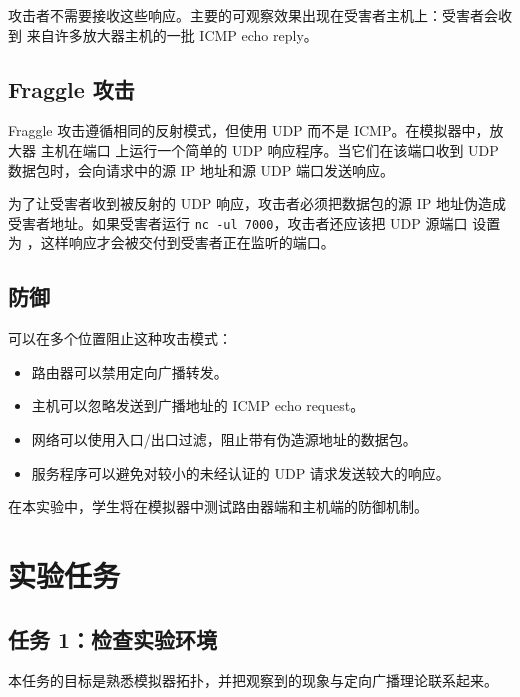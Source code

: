攻击者不需要接收这些响应。主要的可观察效果出现在受害者主机上：受害者会收到
来自许多放大器主机的一批 ICMP echo reply。


\subsection{Fraggle 攻击}

Fraggle 攻击遵循相同的反射模式，但使用 UDP 而不是 ICMP。在模拟器中，放大器
主机在端口 \fraggleport 上运行一个简单的 UDP 响应程序。当它们在该端口收到
UDP 数据包时，会向请求中的源 IP 地址和源 UDP 端口发送响应。

为了让受害者收到被反射的 UDP 响应，攻击者必须把数据包的源 IP 地址伪造成
受害者地址。如果受害者运行 \texttt{nc -ul 7000}，攻击者还应该把 UDP 源端口
设置为 \fraggleport，这样响应才会被交付到受害者正在监听的端口。


\subsection{防御}

可以在多个位置阻止这种攻击模式：

\begin{itemize}[noitemsep]
\item 路由器可以禁用定向广播转发。
\item 主机可以忽略发送到广播地址的 ICMP echo request。
\item 网络可以使用入口/出口过滤，阻止带有伪造源地址的数据包。
\item 服务程序可以避免对较小的未经认证的 UDP 请求发送较大的响应。
\end{itemize}

在本实验中，学生将在模拟器中测试路由器端和主机端的防御机制。


\section{实验任务}


\subsection{任务 1：检查实验环境}

本任务的目标是熟悉模拟器拓扑，并把观察到的现象与定向广播理论联系起来。

